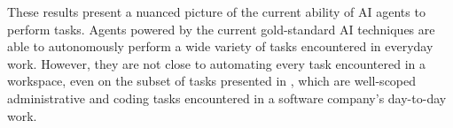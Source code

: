 \documentclass{article}
\begin{document}
These results present a nuanced picture of the current ability of AI agents to perform tasks.
Agents powered by the current gold-standard AI techniques are able to autonomously perform a wide variety of tasks encountered in everyday work.
However, they are not close to automating every task encountered in a workspace, even on the subset of tasks presented in \tac, which are well-scoped administrative and coding tasks encountered in a software company's day-to-day work.

\end{document}

